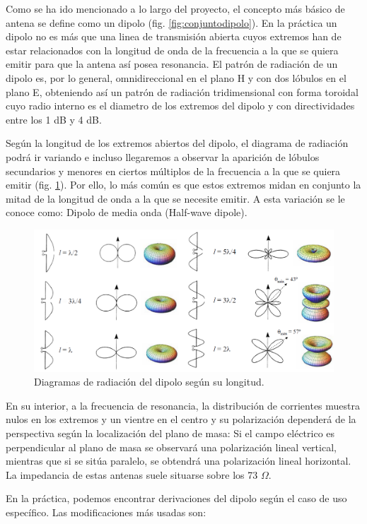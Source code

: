 \par Como se ha ido mencionado a lo largo del proyecto, el concepto más básico de antena se define como un dipolo (fig. \ref{fig:conjuntodipolo}). En la práctica un dipolo no es más que una linea de transmisión abierta cuyos extremos han de estar relacionados con la longitud de onda de la frecuencia a la que se quiera emitir para que la antena así posea resonancia. El patrón de radiación de un dipolo es, por lo general, omnidireccional en el plano H y con dos lóbulos en el plano E, obteniendo así un patrón de radiación tridimensional con forma toroidal cuyo radio interno es el diametro de los extremos del dipolo y con directividades entre los 1 dB y 4 dB. 
\\ 
\par Según la longitud de los extremos abiertos del dipolo, el diagrama de radiación podrá ir variando e incluso llegaremos a observar la aparición de lóbulos secundarios y menores en ciertos múltiplos de la frecuencia a la que se quiera emitir (fig. \ref{fig:diagramadipolo}). Por ello, lo más común es que estos extremos midan en conjunto la mitad de la longitud de onda a la que se necesite emitir. A esta variación se le conoce como: Dipolo de media onda (Half-wave dipole). \cite{TutorialsPoint2018}
\\

\begin{figure}[h]
    \centering
        \includegraphics[width=\textwidth]{archivos/dipolo/radiaciones}
        \caption{Diagramas de radiación del dipolo según su longitud. \cite{Cardama2002}}
        \label{fig:diagramadipolo}
\end{figure}

\par En su interior, a la frecuencia de resonancia, la distribución de corrientes muestra nulos en los extremos y un vientre en el centro y su polarización dependerá de la perspectiva según la localización del plano de masa: Si el campo eléctrico es perpendicular al plano de masa se observará una polarización lineal vertical, mientras que si se sitúa paralelo, se obtendrá una polarización lineal horizontal. La impedancia de estas antenas suele situarse sobre los 73 $\Omega$.
\\
\par En la práctica, podemos encontrar derivaciones del dipolo según el caso de uso específico. Las modificaciones más usadas son:

